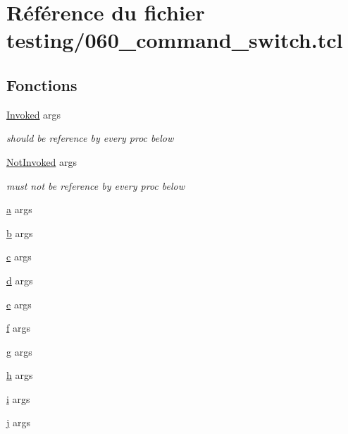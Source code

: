 \hypertarget{060__command__switch_8tcl}{}\section{Référence du fichier testing/060\+\_\+command\+\_\+switch.tcl}
\label{060__command__switch_8tcl}
\subsection*{Fonctions}
\begin{DoxyCompactItemize}
\item 
\hyperlink{060__command__switch_8tcl_aa889853547f65a22ae133cd57ff89601}{Invoked} args
\begin{DoxyCompactList}\small\item\em should be reference by every proc below \end{DoxyCompactList}\item 
\hyperlink{060__command__switch_8tcl_a3f55465410c57ed00ab28827a741b1c3}{Not\+Invoked} args
\begin{DoxyCompactList}\small\item\em must not be reference by every proc below \end{DoxyCompactList}\item 
\hyperlink{060__command__switch_8tcl_ab08ae027fc5777bc4f0629f1b60b35db}{a} args
\item 
\hyperlink{060__command__switch_8tcl_a68bdb74c144118d936931c46f75d4b3e}{b} args
\item 
\hyperlink{060__command__switch_8tcl_ab14f56bc3bd7680490ece4ad7815465f}{c} args
\item 
\hyperlink{060__command__switch_8tcl_af43f4b1f0064a33b2d662af9f06d3a00}{d} args
\item 
\hyperlink{060__command__switch_8tcl_aff65a51a703804e0ad1adbcfd76c86f8}{e} args
\item 
\hyperlink{060__command__switch_8tcl_af6830d2c644b45088ea8f1f74a46b778}{f} args
\item 
\hyperlink{060__command__switch_8tcl_af08b4b5bfa9edf0b0a7dee1c2b2c29e0}{g} args
\item 
\hyperlink{060__command__switch_8tcl_af96fd0966e32a310a0778d2e5c357700}{h} args
\item 
\hyperlink{060__command__switch_8tcl_a8c90afd4641b25be86bd09983c3cbee0}{i} args
\item 
\hyperlink{060__command__switch_8tcl_a2aaa92757686acea102cba3475f0c13b}{j} args

\end{DoxyCompactItemize}
